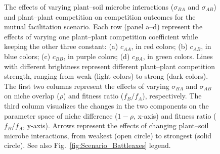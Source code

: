\clearpage
\begin{figure}[htbp]
	\centering
	\caption[The effects of varying plant--soil microbe interactions ($\sigma_{BA}$ and $\sigma_{AB}$) and plant--plant competition on competition outcomes for the mutual facilitation scenario.]
		{The effects of varying plant--soil microbe interactions ($\sigma_{BA}$ and $\sigma_{AB}$) and plant--plant competition on competition outcomes for the mutual facilitation scenario.
		Each row (panel a--d) represent the effects of varying one plant--plant competition coefficient while keeping the other three constant: (a) $c_{AA}$, in red colors; (b) $c_{AB}$, in blue colors; (c) $c_{BB}$, in purple colors; (d) $c_{BA}$, in green colors. Lines with different brightness represent different plant--plant competition strength, ranging from weak (light colors) to strong (dark colors).
		The first two columns represent the effects of varying $\sigma_{BA}$ and $\sigma_{AB}$ on niche overlap ($\rho$) and fitness ratio ($f_{B}/f_{A}$), respectively. The third column visualizes the changes in the two components on the parameter space of niche difference ($1 - \rho$, x-axis) and fitness ratio ($f_{B}/f_{A}$, y-axis). Arrows represent the effects of changing plant--soil microbe interactions, from weakest (open circle) to strongest (solid circle). See also Fig.~\ref{fig:Scenario_Battleaxes} legend.}
	\label{fig:Mutual_Facilitation_everything}
\end{figure}



